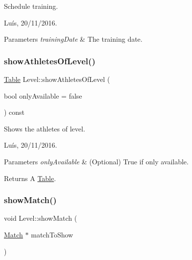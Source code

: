 Schedule training. 

Luís, 20/11/2016. 


\begin{DoxyParams}{Parameters}
{\em training\+Date} & The training date. \\
\hline
\end{DoxyParams}
\hypertarget{class_level_aeacdd2b25ba6fdfadb89290dc3d73513}{}\label{class_level_aeacdd2b25ba6fdfadb89290dc3d73513} 
\subsubsection{\texorpdfstring{show\+Athletes\+Of\+Level()}{showAthletesOfLevel()}}
{\footnotesize\ttfamily \hyperlink{class_table}{Table} Level\+::show\+Athletes\+Of\+Level (\begin{DoxyParamCaption}\item[{bool}]{only\+Available = {\ttfamily false} }\end{DoxyParamCaption}) const}



Shows the athletes of level. 

Luís, 20/11/2016. 


\begin{DoxyParams}{Parameters}
{\em only\+Available} & (Optional) True if only available. \\
\hline
\end{DoxyParams}


\begin{DoxyReturn}{Returns}
A \hyperlink{class_table}{Table}. 
\end{DoxyReturn}
\hypertarget{class_level_abe23e553dbe354819966db88317a095c}{}\label{class_level_abe23e553dbe354819966db88317a095c} 
\subsubsection{\texorpdfstring{show\+Match()}{showMatch()}}
{\footnotesize\ttfamily void Level\+::show\+Match (\begin{DoxyParamCaption}\item[{\hyperlink{class_match}{Match} $\ast$}]{match\+To\+Show }\end{DoxyParamCaption})}



